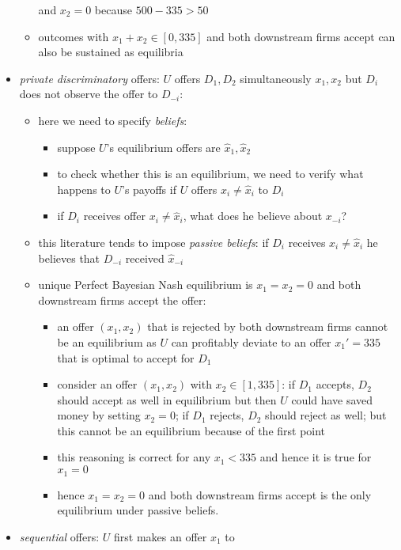 \documentclass[11pt,english]{beamer}
\begin{document}
\begin{frame}[allowframebreaks]
\begin{itemize}
\begin{itemize}
      and $x_2 =0$ because $500-335 > 50$
    \item outcomes with $x_1+x_2 \in [0,335]$ and both downstream
      firms accept can also be sustained as equilibria
    \end{itemize}
  \item \emph{private discriminatory} offers: $U$ offers $D_1,D_2$
    simultaneously $x_1,x_2$ but $D_i$ does not observe the
    offer to $D_{-i}$:
    \begin{itemize}
    \item here we need to specify \emph{beliefs}:
      \begin{itemize}
      \item suppose $U$'s equilibrium offers are $\hat{x}_1,\hat{x}_2$
      \item to check whether this is an equilibrium, we need to verify
        what happens to $U$'s payoffs if $U$ offers $x_i \neq
        \hat{x}_i$ to $D_i$
      \item if $D_i$ receives offer $x_i \neq \hat{x}_i$, what does he
        believe about $x_{-i}$?
      \end{itemize}
  \item this literature tends to impose \emph{passive beliefs}: if
    $D_i$ receives $x_i \neq \hat{x}_i$ he believes that $D_{-i}$
    received $\hat{x}_{-i}$
  \item unique Perfect Bayesian Nash equilibrium is $x_1 = x_2 =0$ and
    both downstream firms accept the offer:
    \begin{itemize}
    \item an offer $(x_1,x_2)$ that is rejected by both downstream
      firms cannot be an equilibrium as $U$ can profitably deviate to
      an offer $x_1'=335$ that is optimal to accept for $D_1$
    \item consider an offer $(x_1,x_2)$ with $x_2 \in [1,335]$: if
      $D_1$ accepts, $D_2$ should accept as well in equilibrium but
      then $U$ could have saved money by setting $x_2 =0$; if $D_1$
      rejects, $D_2$ should reject as well; but this cannot be an
      equilibrium because of the first point
    \item this reasoning is correct for any $x_1 < 335$ and hence it
      is true for $x_1 =0$
    \item hence $x_1=x_2=0$ and both downstream firms accept is the
      only equilibrium under passive beliefs.
    \end{itemize}
    \end{itemize}
  \item \emph{sequential} offers: $U$ first makes an offer $x_1$ to

\end{itemize}
\end{frame}
\end{document}
